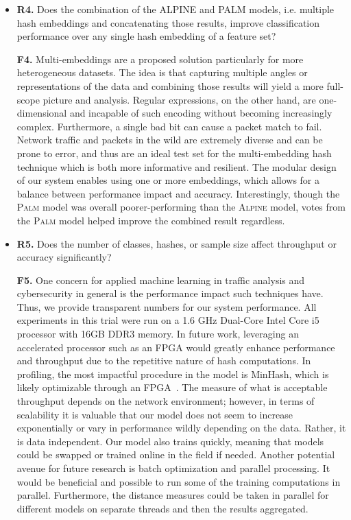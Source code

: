\begin{itemize}
\item\textbf{R4.} Does the combination of the ALPINE and PALM models, i.e. multiple hash embeddings and concatenating those results, improve classification performance over any single hash embedding of a feature set?

\textbf{F4.} Multi-embeddings are a proposed solution particularly for more heterogeneous datasets. The idea is that capturing multiple angles or representations of the data and combining those results will yield a more full-scope picture and analysis. Regular expressions, on the other hand, are one-dimensional and incapable of such encoding without becoming increasingly complex. Furthermore, a single bad bit can cause a packet match to fail. Network traffic and packets in the wild are extremely diverse and can be prone to error, and thus are an ideal test set for the multi-embedding hash technique which is both more informative and resilient. The modular design of our system enables using one or more embeddings, which allows for a balance between performance impact and accuracy. Interestingly, though the \textsc{Palm} model was overall poorer-performing than the \textsc{Alpine} model, votes from the \textsc{Palm} model helped improve the combined result regardless.

\item\textbf{R5.} Does the number of classes, hashes, or sample size affect throughput or accuracy significantly?

\textbf{F5.} One concern for applied machine learning in traffic analysis and cybersecurity in general is the performance impact such techniques have. Thus, we provide transparent numbers for our system performance. All experiments in this trial were run on a 1.6 GHz Dual-Core Intel Core i5 processor with 16GB DDR3 memory. In future work, leveraging an accelerated processor such as an FPGA would greatly enhance performance and throughput due to the repetitive nature of hash computations. In profiling, the most impactful procedure in the model is MinHash, which is likely optimizable through an FPGA~\cite{fpga}. The measure of what is acceptable throughput depends on the network environment; however, in terms of scalability it is valuable that our model does not seem to increase exponentially or vary in performance wildly depending on the data. Rather, it is data independent. Our model also trains quickly, meaning that models could be swapped or trained online in the field if needed. Another potential avenue for future research is batch optimization and parallel processing. It would be beneficial and possible to run some of the training computations in parallel. Furthermore, the distance measures could be taken in parallel for different models on separate threads and then the results aggregated.


\end{itemize}
